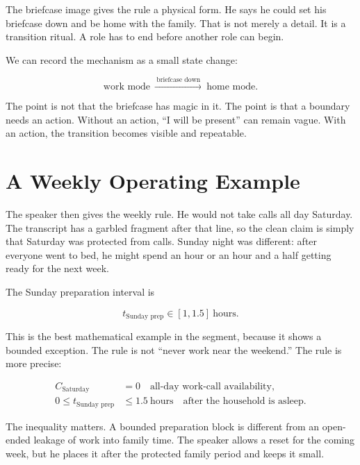 The briefcase image gives the rule a physical form. He says he could set his briefcase down and be home with the family. That is not merely a detail. It is a transition ritual. A role has to end before another role can begin.

We can record the mechanism as a small state change:

\begin{equation}
\text{work mode}
\ \xrightarrow{\ \text{briefcase down}\ }\
\text{home mode}.
\end{equation}

The point is not that the briefcase has magic in it. The point is that a boundary needs an action. Without an action, ``I will be present'' can remain vague. With an action, the transition becomes visible and repeatable.

\section{A Weekly Operating Example}

The speaker then gives the weekly rule. He would not take calls all day Saturday. The transcript has a garbled fragment after that line, so the clean claim is simply that Saturday was protected from calls. Sunday night was different: after everyone went to bed, he might spend an hour or an hour and a half getting ready for the next week.

The Sunday preparation interval is

\begin{equation}
t_{\text{Sunday prep}}
\in
[1,1.5]\ \text{hours}.
\end{equation}

This is the best mathematical example in the segment, because it shows a bounded exception. The rule is not ``never work near the weekend.'' The rule is more precise:

\begin{align}
C_{\text{Saturday}} &= 0
\quad \text{all-day work-call availability,}\\
0 \leq t_{\text{Sunday prep}} &\leq 1.5\ \text{hours}
\quad \text{after the household is asleep.}
\end{align}

The inequality matters. A bounded preparation block is different from an open-ended leakage of work into family time. The speaker allows a reset for the coming week, but he places it after the protected family period and keeps it small.

